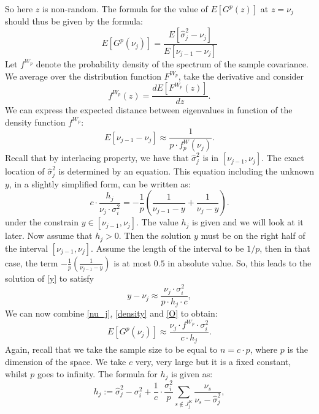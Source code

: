\documentclass[12pt]{amsart}
\theoremstyle{definition}
\numberwithin{equation}{section}
\numberwithin{equation}{section}
\theoremstyle{remark}
\numberwithin{equation}{section}
\begin{document}
So here $z$ is non-random. The formula for
	the value of $E[G^p(z)]$ at $z=\nu_j$ should thus be given by the formula:
	\begin{equation}
	\label{O}
	E[G^p(\nu_j)]=\frac{E[\hat{\sigma}^2_j-\nu_{j}]}{E[\nu_{j-1}-\nu_j]}
	\end{equation}
	Let $f^{W_p}$ denote the probability density of the spectrum of the sample covariance. We average over the distribution function $F^{W_p}$, take the derivative and consider
	$$f^{W_p}(z)=\frac{dE[F^{W_p}(z)]}{dz}.$$
	We can express the expected distance between eigenvalues in function of
	the density function $f^{W_p}$:
	\begin{equation}
	\label{density}
	E[\nu_{j-1}-\nu_j]\approx \frac{1}{p\cdot f^W_p(\nu_j)}.
	\end{equation}
	Recall that by interlacing property, we have that $\hat{\sigma}^2_j$ is in
	$[\nu_{j-1},\nu_{j}]$. The exact location of $\hat{\sigma}^2_j$ is determined by
	an equation. This  equation including the unknown $y$,
	in a slightly simplified form, can be written as:
	\begin{equation}
	\label{y}
	c\cdot \frac{h_j}{\nu_j\cdot \sigma^2_i}=-\frac{1}{p}\left(\frac{1}{\nu_{j-1}-y}+\frac{1}{\nu_{j}-y}\right).
\end{equation}
under the constrain $y\in[\nu_{j-1},\nu_j]$.
The value  $h_j$ is given and we will look at it later. Now assume that $h_j>0$. Then the solution $y$ must be on the right half of the interval
$[\nu_{j-1},\nu_j]$. Assume the length of the interval to be $1/p$, then in that case,
the term $-\frac{1}{p}\left(\frac{1}{\nu_{j-1}-y}\right)$ is at most $0.5$ in absolute value.
So, this leads to the solution of \ref{y} to satisfy
\begin{equation}
\label{nu_j}
y-\nu_j\approx \frac{\nu_j\cdot \sigma^2_i}{p\cdot h_j\cdot c},
\end{equation}
We can now combine  \ref{nu_j}, \ref{density} and \ref{O} to obtain:
\begin{equation}
\label{approximationEG}E[G^p(\nu_j)]\approx\frac{\nu_j\cdot f^{W_p}\cdot \sigma_i^2}{c\cdot h_j}.
\end{equation}
Again, recall that we take the sample size to be equal to $n=c\cdot p$,
where $p$ is the dimension of the space. We  take $c$ very, very large but
it is a fixed constant, whilst  $p$ goes to infinity.
The formula for $h_j$ is given as:
\begin{equation}
\label{hj}
h_j:= \hat{\sigma}^2_j-\sigma_i^2+\frac{1}{c}\cdot \frac{\sigma_i^2}{p}\sum_{s\notin J^K_j}\frac{\nu_s}{\nu_s-\hat{\sigma}^2_j},
\end{equation}
\end{document}
